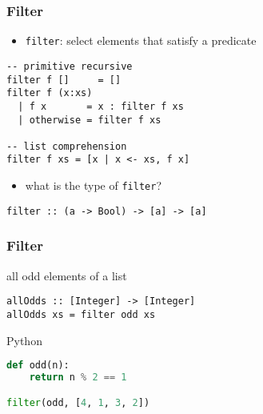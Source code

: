 \documentclass[dvipsnames]{beamer}
\theoremstyle{plain}
\begin{document}
\begin{frame}[fragile]
  \frametitle{Filter}

  \begin{itemize}
    \item \lstinline{filter}: select elements that satisfy a predicate
  \end{itemize}

  \begin{exampleblock}{}
    \begin{lstlisting}
-- primitive recursive
filter f []     = []
filter f (x:xs)
  | f x       = x : filter f xs
  | otherwise = filter f xs

-- list comprehension
filter f xs = [x | x <- xs, f x]
    \end{lstlisting}
  \end{exampleblock}

  \pause
  \begin{itemize}
    \item what is the type of \lstinline{filter}?
  \end{itemize}

  \begin{lstlisting}
filter :: (a -> Bool) -> [a] -> [a]
  \end{lstlisting}
\end{frame}

\begin{frame}[fragile]
  \frametitle{Filter}

  \begin{exampleblock}{all odd elements of a list}
    \begin{lstlisting}
allOdds :: [Integer] -> [Integer]
allOdds xs = filter odd xs
    \end{lstlisting}
  \end{exampleblock}

  \bigskip
  \begin{exampleblock}{Python}
    \begin{lstlisting}[language=python]
def odd(n):
    return n % 2 == 1

filter(odd, [4, 1, 3, 2])
    \end{lstlisting}
  \end{exampleblock}
\end{frame}
\end{document}
